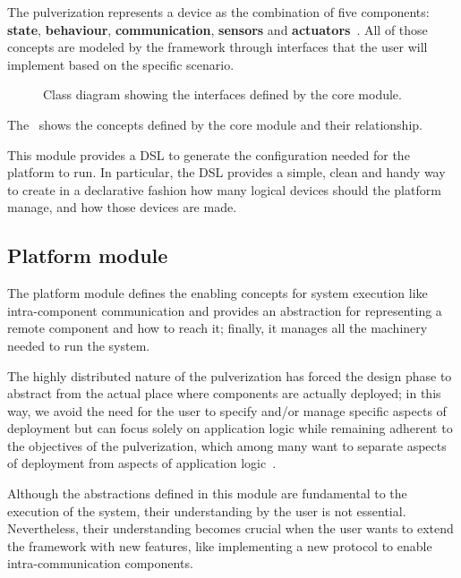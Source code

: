 The pulverization represents a device as the combination of five components: \textbf{state}, \textbf{behaviour}, \textbf{communication},
\textbf{sensors} and \textbf{actuators}~\cite{fi12110203}.
All of those concepts are modeled by the framework through interfaces that the user will implement based on the specific scenario.

\begin{figure}
	\centering
	\caption{Class diagram showing the interfaces defined by the core module.}
	\label{fig:core-module-architecture}
\end{figure}

The~ shows the concepts defined by the core module and their relationship.

This module provides a DSL to generate the configuration needed for the platform to run. In particular, the DSL provides a simple, clean and handy
way to create in a declarative fashion how many logical devices should the platform manage, and how those devices are made.

\subsection{Platform module}
\label{sec:platform-module}

The platform module defines the enabling concepts for system execution like intra-component communication and provides an abstraction for
representing a remote component and how to reach it; finally, it manages all the machinery needed to run the system.

The highly distributed nature of the pulverization has forced the design phase to abstract from the actual place where components are actually
deployed; in this way, we avoid the need for the user to specify and/or manage specific aspects of deployment but can focus solely on
application logic while remaining adherent to the objectives of the pulverization, which among many want to separate aspects of
deployment from aspects of application logic~\cite{fi12110203}.

Although the abstractions defined in this module are fundamental to the execution of the system, their understanding by the user is not essential.
Nevertheless, their understanding becomes crucial when the user wants to extend the framework with new features, like implementing a new protocol to
enable intra-communication components.

